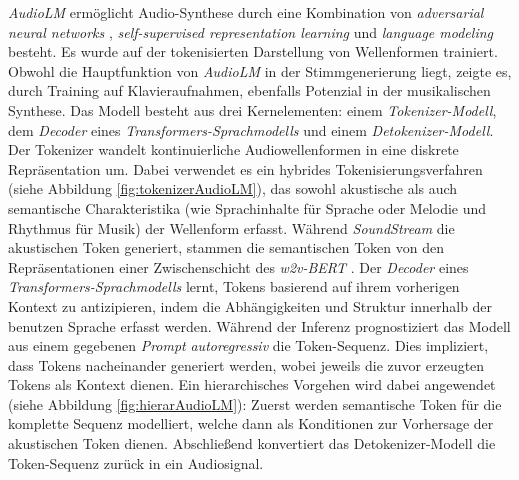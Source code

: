 \documentclass[
  a4paper,  %
  twoside,  %
  bibliography=totoc,
  headsepline,
  cleardoublepage=empty,
  parskip=half,
  draft=false
]{scrbook}
\begin{document}
\emph{AudioLM} \cite{borsos_audiolm_2022} ermöglicht Audio-Synthese durch eine Kombination von \emph{adversarial neural networks} \cite{goodfellow_generative_2014}, \emph{self-supervised representation learning} \cite{chung_w2v-bert_2021} und \emph{language modeling} \cite{roberts_scaling_2022} besteht. Es wurde auf der tokenisierten Darstellung von Wellenformen trainiert. Obwohl die Hauptfunktion von \emph{AudioLM} in der Stimmgenerierung liegt, zeigte es, durch Training auf Klavieraufnahmen, ebenfalls Potenzial in der musikalischen Synthese.  Das Modell besteht aus drei Kernelementen: einem \emph{Tokenizer-Modell}, dem \emph{Decoder} eines \emph{Transformers-Sprachmodells} \cite{vaswani_attention_2017} und einem \emph{Detokenizer-Modell}. Der Tokenizer wandelt kontinuierliche Audiowellenformen in eine diskrete Repräsentation um. Dabei verwendet es ein hybrides Tokenisierungsverfahren (siehe Abbildung \ref{fig:tokenizerAudioLM}), das sowohl akustische als auch semantische Charakteristika (wie Sprachinhalte für Sprache oder Melodie und Rhythmus für Musik) der Wellenform erfasst. Während \emph{SoundStream} \cite{zeghidour_soundstream_2021} die akustischen Token generiert, stammen die semantischen Token von den Repräsentationen einer Zwischenschicht des \emph{w2v-BERT} \cite{chung_w2v-bert_2021}. Der \emph{Decoder} eines \emph{Transformers-Sprachmodells} \cite{vaswani_attention_2017} lernt, Tokens basierend auf ihrem vorherigen Kontext zu antizipieren, indem die Abhängigkeiten und Struktur innerhalb der benutzen Sprache erfasst werden. Während der Inferenz prognostiziert das Modell aus einem gegebenen \emph{Prompt} \emph{autoregressiv} die Token-Sequenz. Dies impliziert, dass Tokens nacheinander generiert werden, wobei jeweils die zuvor erzeugten Tokens als Kontext dienen. Ein hierarchisches Vorgehen wird dabei angewendet (siehe Abbildung \ref{fig:hierarAudioLM}): Zuerst werden semantische Token für die komplette Sequenz modelliert, welche dann als Konditionen zur Vorhersage der akustischen Token dienen. Abschließend konvertiert das Detokenizer-Modell die Token-Sequenz zurück in ein Audiosignal. \cite{borsos_audiolm_2022}
\end{document}
